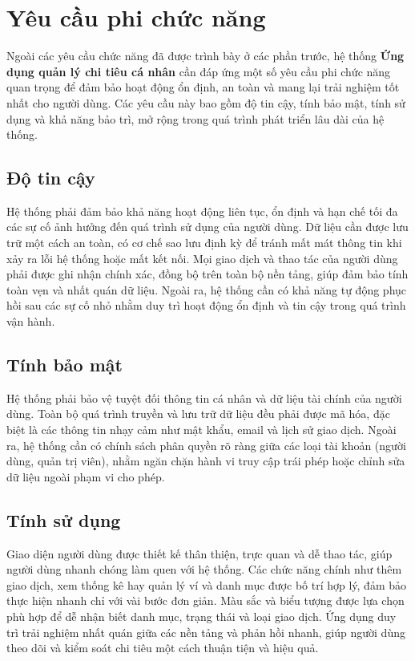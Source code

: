 \documentclass[../DoAn.tex]{subfiles}
\begin{document}
\section{Yêu cầu phi chức năng}
\label{section:2.4}

Ngoài các yêu cầu chức năng đã được trình bày ở các phần trước, hệ thống \textbf{Ứng dụng quản lý chi tiêu cá nhân} cần đáp ứng một số yêu cầu phi chức năng quan trọng để đảm bảo hoạt động ổn định, an toàn và mang lại trải nghiệm tốt nhất cho người dùng. Các yêu cầu này bao gồm độ tin cậy, tính bảo mật, tính sử dụng và khả năng bảo trì, mở rộng trong quá trình phát triển lâu dài của hệ thống.

\subsection{Độ tin cậy}
Hệ thống phải đảm bảo khả năng hoạt động liên tục, ổn định và hạn chế tối đa các sự cố ảnh hưởng đến quá trình sử dụng của người dùng. Dữ liệu cần được lưu trữ một cách an toàn, có cơ chế sao lưu định kỳ để tránh mất mát thông tin khi xảy ra lỗi hệ thống hoặc mất kết nối. Mọi giao dịch và thao tác của người dùng phải được ghi nhận chính xác, đồng bộ trên toàn bộ nền tảng, giúp đảm bảo tính toàn vẹn và nhất quán dữ liệu. Ngoài ra, hệ thống cần có khả năng tự động phục hồi sau các sự cố nhỏ nhằm duy trì hoạt động ổn định và tin cậy trong quá trình vận hành.

\subsection{Tính bảo mật}
Hệ thống phải bảo vệ tuyệt đối thông tin cá nhân và dữ liệu tài chính của người dùng. Toàn bộ quá trình truyền và lưu trữ dữ liệu đều phải được mã hóa, đặc biệt là các thông tin nhạy cảm như mật khẩu, email và lịch sử giao dịch. Ngoài ra, hệ thống cần có chính sách phân quyền rõ ràng giữa các loại tài khoản (người dùng, quản trị viên), nhằm ngăn chặn hành vi truy cập trái phép hoặc chỉnh sửa dữ liệu ngoài phạm vi cho phép.

\subsection{Tính sử dụng}
Giao diện người dùng được thiết kế thân thiện, trực quan và dễ thao tác, giúp người dùng nhanh chóng làm quen với hệ thống. Các chức năng chính như thêm giao dịch, xem thống kê hay quản lý ví và danh mục được bố trí hợp lý, đảm bảo thực hiện nhanh chỉ với vài bước đơn giản. Màu sắc và biểu tượng được lựa chọn phù hợp để dễ nhận biết danh mục, trạng thái và loại giao dịch. Ứng dụng duy trì trải nghiệm nhất quán giữa các nền tảng và phản hồi nhanh, giúp người dùng theo dõi và kiểm soát chi tiêu một cách thuận tiện và hiệu quả.
\end{document}
